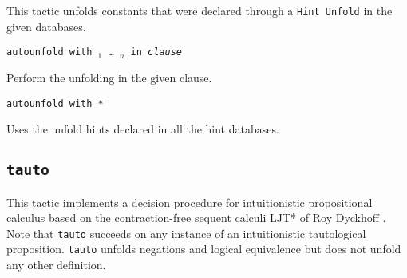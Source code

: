 \begin{coq_example*}
This tactic unfolds constants that were declared through a {\tt Hint
  Unfold} in the given databases.

\begin{Variants}
\item {\tt autounfold with \ident$_1$ \dots\ \ident$_n$ in \textit{clause}}

  Perform the unfolding in the given clause.

\item {\tt autounfold with *}

  Uses the unfold hints declared in all the hint databases.
\end{Variants}


%


\subsection{\tt tauto
\label{tauto}}

This tactic implements a decision procedure for intuitionistic propositional
calculus based on the contraction-free sequent calculi LJT* of Roy Dyckhoff
\cite{Dyc92}. Note that {\tt tauto} succeeds on any instance of an
intuitionistic tautological proposition. {\tt tauto} unfolds negations
and logical equivalence but does not unfold any other definition.


\end{coq_example*}
